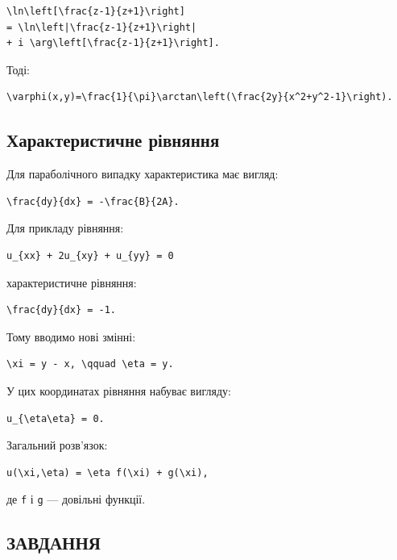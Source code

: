 \documentclass[
  ukrainian,
]{article}
\begin{document}
\begin{verbatim}
\ln\left[\frac{z-1}{z+1}\right]
= \ln\left|\frac{z-1}{z+1}\right|
+ i \arg\left[\frac{z-1}{z+1}\right].
\end{verbatim}

Тоді:

\begin{verbatim}
\varphi(x,y)=\frac{1}{\pi}\arctan\left(\frac{2y}{x^2+y^2-1}\right).
\end{verbatim}

\subsection{Характеристичне
рівняння}\label{ux445ux430ux440ux430ux43aux442ux435ux440ux438ux441ux442ux438ux447ux43dux435-ux440ux456ux432ux43dux44fux43dux43dux44f}

Для параболічного випадку характеристика має вигляд:

\begin{verbatim}
\frac{dy}{dx} = -\frac{B}{2A}.
\end{verbatim}

Для прикладу рівняння:

\begin{verbatim}
u_{xx} + 2u_{xy} + u_{yy} = 0
\end{verbatim}

характеристичне рівняння:

\begin{verbatim}
\frac{dy}{dx} = -1.
\end{verbatim}

Тому вводимо нові змінні:

\begin{verbatim}
\xi = y - x, \qquad \eta = y.
\end{verbatim}

У цих координатах рівняння набуває вигляду:

\begin{verbatim}
u_{\eta\eta} = 0.
\end{verbatim}

Загальний розв'язок:

\begin{verbatim}
u(\xi,\eta) = \eta f(\xi) + g(\xi),
\end{verbatim}

де \texttt{f} і \texttt{g} --- довільні функції.

\subsection{ЗАВДАННЯ}\label{ux437ux430ux432ux434ux430ux43dux43dux44f-4}
\end{document}

